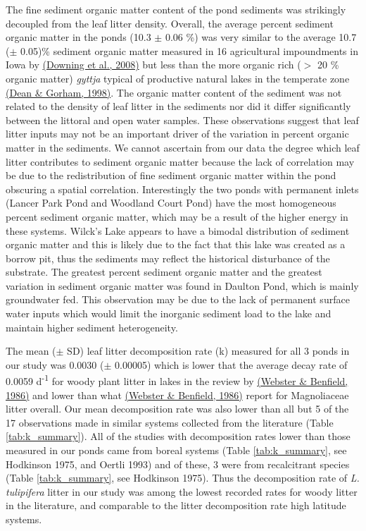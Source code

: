 \documentclass[12pt,letter]{article}
\begin{document}
The fine sediment organic matter content of the pond sediments was strikingly decoupled from the leaf litter density. Overall, the average percent sediment organic matter in the ponds (10.3 $\pm$ 0.06 \%) was very similar to the average 10.7 ($\pm$ 0.05)\% sediment organic matter measured in 16 agricultural impoundments in Iowa by \hyperref[csl:42]{(Downing et al., 2008)} but less than the more organic rich ($>$ 20 \% organic matter) \emph{gyttja} typical of productive natural lakes in the temperate zone \hyperref[csl:43]{(Dean \& Gorham, 1998)}. The organic matter content of the sediment was not related to the density of leaf litter in the sediments nor did it differ significantly between the littoral and open water samples. These observations suggest that leaf litter inputs may not be an important driver of the variation in percent organic matter in the sediments.  We cannot ascertain from our data the degree which leaf litter contributes to sediment organic matter because the lack of correlation may be due to the redistribution of fine sediment organic matter within the pond obscuring a spatial correlation. Interestingly the two ponds with permanent inlets (Lancer Park Pond and Woodland Court Pond) have the most homogeneous percent sediment organic matter, which may be a result of the higher energy in these systems. Wilck's Lake appears to have a bimodal distribution of sediment organic matter and this is likely due to the fact that this lake was created as a borrow pit, thus the sediments may reflect the historical disturbance of the substrate. The greatest percent sediment organic matter and the greatest variation in sediment organic matter was found in Daulton Pond, which is mainly groundwater fed. This observation may be due to the lack of permanent surface water inputs which would limit the inorganic sediment load to the lake and maintain higher sediment heterogeneity.

The mean ($\pm$ SD) leaf litter decomposition rate (k) measured for all 3 ponds in our study was 0.0030 ($\pm$ 0.00005) which is lower that the average decay rate of 0.0059 d\textsuperscript{-1} for woody plant litter in lakes in the review by \hyperref[csl:13]{(Webster \& Benfield, 1986)} and lower than what \hyperref[csl:13]{(Webster \& Benfield, 1986)} report for Magnoliaceae litter overall.  Our mean decomposition rate was also lower than all but 5 of the 17 observations made in similar systems collected from the literature (Table \ref{tab:k_summary}). All of the studies with decomposition rates lower than those measured in our ponds came from boreal systems (Table \ref{tab:k_summary}, see Hodkinson 1975, and Oertli 1993) and of these, 3 were from recalcitrant species (Table \ref{tab:k_summary}, see Hodkinson 1975). Thus the decomposition rate of \emph{L. tulipifera} litter in our study was among the lowest recorded rates for woody litter in the literature, and comparable to the litter decomposition rate high latitude systems. 
\end{document}
